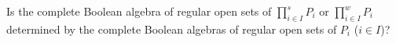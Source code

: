 Is the complete Boolean algebra of regular open sets of $\prod_{i \in I}^{s} P_i$ or $\prod_{i \in I}^{w} P_i$ determined by the complete Boolean algebras of regular open sets of $P_i$ ($i \in I$)?
